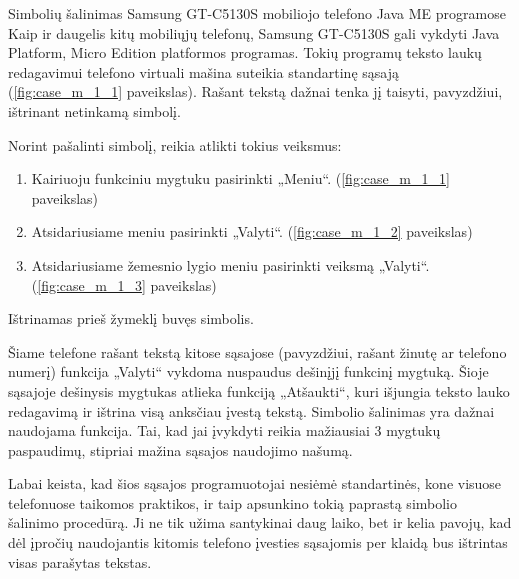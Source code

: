 \begin{xcase}{Simbolių šalinimas Samsung GT-C5130S mobiliojo telefono
              Java ME programose}
  \xcgoal
  {
    Kaip ir daugelis kitų mobiliųjų telefonų, Samsung GT-C5130S gali vykdyti
    Java Platform, Micro Edition platformos programas. Tokių programų
    teksto laukų redagavimui telefono virtuali mašina suteikia standartinę
    sąsają (\ref{fig:case_m_1_1} paveikslas). Rašant tekstą dažnai tenka jį
    taisyti, pavyzdžiui, ištrinant  netinkamą simbolį.
  }
  
  \xctools
  {
    Norint pašalinti simbolį, reikia atlikti tokius veiksmus:
    \begin{enumerate}
      \item Kairiuoju funkciniu mygtuku pasirinkti „Meniu“.
        (\ref{fig:case_m_1_1} paveikslas)
      \item Atsidariusiame meniu pasirinkti „Valyti“.
        (\ref{fig:case_m_1_2} paveikslas)
      \item Atsidariusiame žemesnio lygio meniu pasirinkti veiksmą „Valyti“.
        (\ref{fig:case_m_1_3} paveikslas)
    \end{enumerate}

    {
    }
  }
  
  \xcresult
  {
    Ištrinamas prieš žymeklį buvęs simbolis.
  }
  
  \xcprinciples
  {
    {
      Šiame telefone rašant tekstą kitose sąsajose (pavyzdžiui, rašant
      žinutę ar telefono numerį) funkcija „Valyti“ vykdoma nuspaudus
      dešinįjį funkcinį mygtuką. Šioje sąsajoje dešinysis mygtukas atlieka
      funkciją „Atšaukti“, kuri išjungia teksto lauko redagavimą ir
      ištrina visą anksčiau įvestą tekstą.
    }
    {
      Simbolio šalinimas yra dažnai naudojama funkcija. Tai, kad jai
      įvykdyti reikia mažiausiai 3 mygtukų paspaudimų, stipriai mažina
      sąsajos naudojimo našumą.
    }
  }
  
  \xcthoughts
  {
    Labai keista, kad šios sąsajos programuotojai nesiėmė standartinės, kone
    visuose telefonuose taikomos praktikos, ir taip apsunkino tokią paprastą
    simbolio šalinimo procedūrą. Ji ne tik užima santykinai daug laiko, bet
    ir kelia pavojų, kad dėl įpročių naudojantis kitomis telefono įvesties
    sąsajomis per klaidą bus ištrintas visas parašytas tekstas.
  }
\end{xcase}
